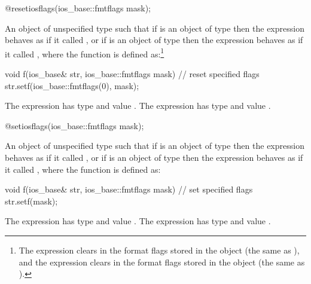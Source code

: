 %
\begin{itemdecl}
@\unspec@ resetiosflags(ios_base::fmtflags mask);
\end{itemdecl}

\begin{itemdescr}
\pnum
\returns
An object of
unspecified type such that if  is an object of type
 then the expression
 behaves as if it called
, or if  is an object of type
 then the expression
 behaves as if it called
, where the function 
is defined as:\footnote{ The expression 
clears  in the format flags stored in the
 object  (the same as
), and the expression
 clears  in the
format flags stored in the  object
 (the same as ). }

\begin{codeblock}
void f(ios_base& str, ios_base::fmtflags mask) {
  // reset specified flags
  str.setf(ios_base::fmtflags(0), mask);
}
\end{codeblock}

The expression  has
type  and value . The
expression  has type
 and value .
\end{itemdescr}

%
\begin{itemdecl}
@\unspec@ setiosflags(ios_base::fmtflags mask);
\end{itemdecl}

\begin{itemdescr}
\pnum
\returns
An object of unspecified type such that if
is an object of type
then the expression
behaves as if it called
,
or if
is an object of type
then the expression
behaves as if it called
, where the function  is defined as:
%

\begin{codeblock}
void f(ios_base& str, ios_base::fmtflags mask) {
  // set specified flags
  str.setf(mask);
}
\end{codeblock}

The expression
has type
and value
.
The expression
has type
and value
.
\end{itemdescr}

